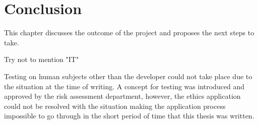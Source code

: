 \chapter[conclusion]{Conclusion}

This chapter discusses the outcome of the project and proposes the next steps to take.

Try not to mention "IT"

Testing on human subjects other than the developer could not take place due to the situation at the time of writing. A concept for testing was introduced and approved by the risk assessment department, however, the ethics application could not be resolved with the situation making the application process impossible to go through in the short period of time that this thesis was written.
